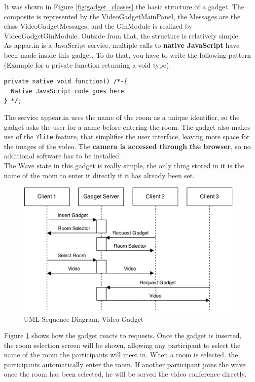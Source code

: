 It was shown in Figure \ref{fig:gadget_classes} the basic structure of a gadget. The composite is represented by the VideoGadgetMainPanel, the Messages are the class VideoGadgetMessages, and the GinModule is realized by VideoGadgetGinModule. Outside from that, the structure is relatively simple.\\[.2cm]
As appar.in is a JavaScript service, multiple calls to \textbf{native JavaScript} have been made inside this gadget. To do that, you have to write the following pattern (Example for a private function returning a void type):
\begin{verbatim}
private native void function() /*-{
  Native JavaScript code goes here
}-*/;
\end{verbatim}
The service appear.in uses the name of the room as a unique identifier, so the gadget asks the user for a name before entering the room. The gadget also makes use of the \verb|?lite| feature, that simplifies the user interface, leaving more space for the images of the video. The \textbf{camera is accessed through the browser}, so no additional software has to be installed.\\[.2cm]
The Wave state in this gadget is really simple, the only thing stored in it is the name of the room to enter it directly if it has already been set.\\[.2cm]
\begin{figure}[h]
  \center
    \includegraphics[keepaspectratio, scale=0.6]{Media/Diagrams/Gadget/VideoSequence.png}
  \caption{UML Sequence Diagram, Video Gadget}
  \label{fig:video_gadget_sequence}
\end{figure}
Figure \ref{fig:video_gadget_sequence} shows how the gadget reacts to requests. Once the gadget is inserted, the room selection screen will be shown, allowing any participant to select the name of the room the participants will meet in. When a room is selected, the participants automatically enter the room. If another participant joins the wave once the room has been selected, he will be served the video conference directly.
